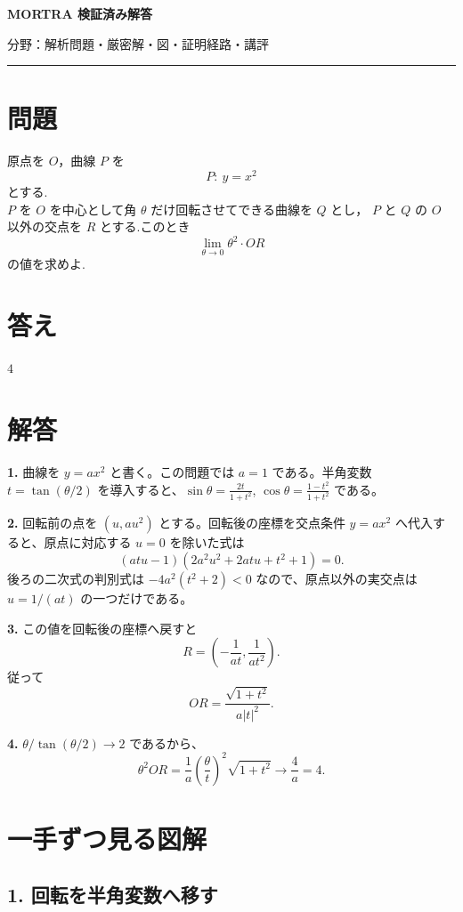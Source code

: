 \documentclass[uplatex,dvipdfmx,11pt]{jsarticle}
\begin{document}
\begin{center}
{\LARGE\bfseries MORTRA 検証済み解答\par}
\vspace{1mm}
{\small 分野：解析\qquad 問題・厳密解・図・証明経路・講評}
\end{center}
\vspace{1mm}
\hrule
\vspace{5mm}

\section*{問題}
原点を $O$，曲線 $P$ を
\[
  P:\ y = x^2
\]
とする.\\
$P$ を $O$ を中心として角 $\theta$ だけ回転させてできる曲線を $Q$ とし，
$P$ と $Q$ の $O$ 以外の交点を $R$ とする.このとき
\[
  \lim_{\theta \to 0} \theta^2 \cdot OR
\]
の値を求めよ.

\section*{答え}
\(4\)

\section*{解答}
\textbf{1.} 曲線を \(y=ax^2\) と書く。この問題では \(a=1\) である。半角変数 \(t=\tan(\theta/2)\) を導入すると、\(\sin \theta=\frac{2t}{1+t^2}\), \(\cos \theta=\frac{1-t^2}{1+t^2}\) である。

\textbf{2.} 回転前の点を \((u,au^2)\) とする。回転後の座標を交点条件 \(y=ax^2\) へ代入すると、原点に対応する \(u=0\) を除いた式は \[(atu-1)(2a^2u^2+2atu+t^2+1)=0.\] 後ろの二次式の判別式は \(-4a^2(t^2+2)<0\) なので、原点以外の実交点は \(u=1/(at)\) の一つだけである。

\textbf{3.} この値を回転後の座標へ戻すと \[R=\left(-\frac1{at},\frac1{at^2}\right).\] 従って \[OR=\frac{\sqrt{1+t^2}}{a|t|^2}.\]

\textbf{4.} \(\theta/\tan(\theta/2)\to2\) であるから、\[\theta^2OR=\frac1a\left(\frac{\theta}{t}\right)^2\sqrt{1+t^2}\longrightarrow\frac4a=4.\]

\clearpage

\section*{一手ずつ見る図解}

\subsection*{1. 回転を半角変数へ移す}
\end{document}
